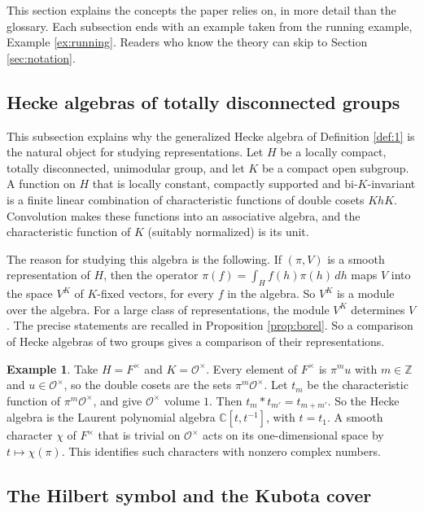 \documentclass[12pt,letterpaper,reqno]{amsart}
\let\cal\mathcal
\theoremstyle{definition}
\newtheorem{example}[theorem]{Example}
\theoremstyle{remark}
\numberwithin{equation}{section}
\begin{document}
This section explains the concepts the paper relies on, in more detail than
the glossary. Each subsection ends with an example taken from the running
example, Example \ref{ex:running}. Readers who know the theory can skip to
Section \ref{sec:notation}.

\subsection{Hecke algebras of totally disconnected groups}
\label{sec:bg-hecke}

This subsection explains why the generalized Hecke algebra of Definition
\ref{def:1} is the natural object for studying representations. Let $H$ be a
locally compact, totally disconnected, unimodular group, and let $K$ be a
compact open subgroup. A function on $H$ that is locally constant, compactly
supported and bi-$K$-invariant is a finite linear combination of
characteristic functions of double cosets $KhK$. Convolution makes these
functions into an associative algebra, and the characteristic function of $K$
(suitably normalized) is its unit.

The reason for studying this algebra is the following. If $(\pi,V)$ is a
smooth representation of $H$, then the operator
$\pi(f)=\int_H f(h)\pi(h)\,dh$ maps $V$ into the space $V^K$ of $K$-fixed
vectors, for every $f$ in the algebra. So $V^K$ is a module over the algebra.
For a large class of representations, the module $V^K$ determines $V$. The
precise statements are recalled in Proposition \ref{prop:borel}. So a
comparison of Hecke algebras of two groups gives a comparison of their
representations.

\begin{example}
\label{ex:bg-hecke}
Take $H=F^\times$ and $K={\cal O}^\times$. Every element of $F^\times$ is
$\pi^m u$ with $m\in\mathbb{Z}$ and $u\in{\cal O}^\times$, so the double cosets
are the sets $\pi^m{\cal O}^\times$. Let $t_m$ be the characteristic function
of $\pi^m{\cal O}^\times$, and give ${\cal O}^\times$ volume $1$. Then
$t_m*t_{m'}=t_{m+m'}$. So the Hecke algebra is the Laurent polynomial algebra
$\mathbb{C}[t,t^{-1}]$, with $t=t_1$. A smooth character $\chi$ of $F^\times$
that is trivial on ${\cal O}^\times$ acts on its one-dimensional space by
$t\mapsto \chi(\pi)$. This identifies such characters with nonzero complex
numbers.
\end{example}

\subsection{The Hilbert symbol and the Kubota cover}
\label{sec:bg-kubota}
\end{document}
